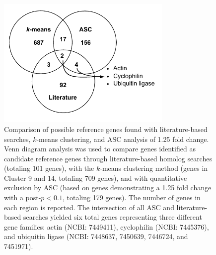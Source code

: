 \begin{figure}[h!]
  \centering
    \includegraphics[width=0.75\textwidth]{Images/C2_Figure3_v6_bw.pdf}
    \caption[Comparison of putative reference genes identified through literature, $k$-means clustering, and ASC analysis]{Comparison of possible reference genes found with literature-based searches, $k$-means clustering, and ASC analysis of 1.25 fold change. Venn diagram analysis was used to compare genes identified as candidate reference genes through literature-based homolog searches (totaling 101 genes), with the $k$-means clustering method (genes in Cluster 9 and 14, totaling 709 genes), and with quantitative exclusion by ASC (based on genes demonstrating a 1.25 fold change with a post-$p < 0.1$, totaling 179 genes). The number of genes in each region is reported. The intersection of all ASC and literature-based searches yielded six total genes representing three different gene families: actin (NCBI: 7449411), cyclophilin (NCBI: 7445376), and ubiquitin ligase (NCBI: 7448637, 7450639, 7446724, and 7451971). }
  \label{fig:c2f3}
\end{figure}

